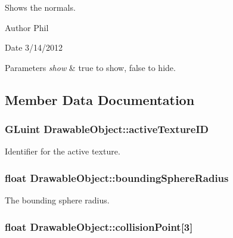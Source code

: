 Shows the normals. 

\begin{DoxyAuthor}{Author}
Phil 
\end{DoxyAuthor}
\begin{DoxyDate}{Date}
3/14/2012
\end{DoxyDate}

\begin{DoxyParams}{Parameters}
{\em show} & true to show, false to hide. \\
\hline
\end{DoxyParams}


\subsection{Member Data Documentation}
\hypertarget{class_drawable_object_af80893517e95399841e8c9c0a632584d}{
\subsubsection[{active\-Texture\-I\-D}]{\setlength{\rightskip}{0pt plus 5cm}G\-Luint {\bf Drawable\-Object\-::active\-Texture\-I\-D}}}\label{class_drawable_object_af80893517e95399841e8c9c0a632584d}
Identifier for the active texture. \hypertarget{class_drawable_object_ab2a5aac6a78a7680449257ebe996f8e4}{
\subsubsection[{bounding\-Sphere\-Radius}]{\setlength{\rightskip}{0pt plus 5cm}float {\bf Drawable\-Object\-::bounding\-Sphere\-Radius}}}\label{class_drawable_object_ab2a5aac6a78a7680449257ebe996f8e4}
The bounding sphere radius. \hypertarget{class_drawable_object_a0d9d6dab30ccb7696a17f262477e678f}{
\subsubsection[{collision\-Point}]{\setlength{\rightskip}{0pt plus 5cm}float {\bf Drawable\-Object\-::collision\-Point}\mbox{[}3\mbox{]}}}\label{class_drawable_object_a0d9d6dab30ccb7696a17f262477e678f}
